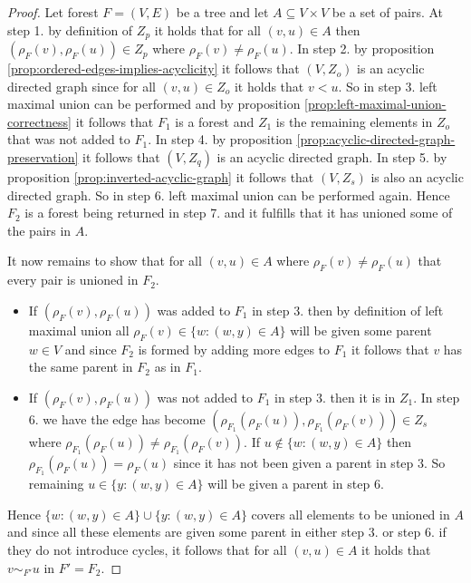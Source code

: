 \documentclass[a4paper,12pt]{article}
\theoremstyle{definition}
\begin{document}
\begin{proof}
    Let forest $F = (V, E)$ be a tree and let $A \subseteq V \times V$ be a set
    of pairs. At step 1. by definition of $Z_p$ it holds that for all $(v, u)
    \in A$ then $(\rho_F(v), \rho_F(u)) \in Z_p$ where $\rho_F(v) \neq
    \rho_F(u)$. In step 2. by proposition
    \ref{prop:ordered-edges-implies-acyclicity} it follows that $(V, Z_o)$ is an
    acyclic directed graph since for all $(v, u) \in Z_o$ it holds that $v < u$.
    So in step 3. left maximal union can be performed and by proposition
    \ref{prop:left-maximal-union-correctness} it follows that $F_1$ is a forest
    and $Z_1$ is the remaining elements in $Z_o$ that was not added to $F_1$. In
    step 4. by proposition \ref{prop:acyclic-directed-graph-preservation} it
    follows that $(V, Z_q)$ is an acyclic directed graph. In step 5. by
    proposition \ref{prop:inverted-acyclic-graph} it follows that $(V, Z_s)$ is
    also an acyclic directed graph. So in step 6. left maximal union can be
    performed again. Hence $F_2$ is a forest being returned in step 7. and it
    fulfills that it has unioned some of the pairs in $A$.

    It now remains to show that for all $(v, u) \in A$ where $\rho_F(v) \neq
    \rho_F(u)$ that every pair is unioned in $F_2$.
    \begin{itemize}
        \item If $(\rho_F(v), \rho_F(u))$ was added to $F_1$ in step 3. then by
         definition of left maximal union all $\rho_F(v) \in \{w : (w, y) \in
         A\}$ will be given some parent $w \in V$ and since $F_2$ is formed by
         adding more edges to $F_1$ it follows that $v$ has the same parent in
         $F_2$ as in $F_1$.
        \item If $(\rho_F(v), \rho_F(u))$ was not added to $F_1$ in step 3. then
        it is in $Z_1$. In step 6. we have the edge has become
        $(\rho_{F_1}(\rho_{F}(u)), \rho_{F_1}(\rho_{F}(v))) \in Z_s$ where
        $\rho_{F_1}(\rho_F(u)) \neq \rho_{F_1}(\rho_{F}(v))$. If $u \notin \{w :
        (w, y) \in A\}$ then $\rho_{F_1}(\rho_{F}(u)) = \rho_{F}(u)$ since it
        has not been given a parent in step 3. So remaining $u \in \{y : (w, y)
        \in A\}$ will be given a parent in step 6.
    \end{itemize}
    Hence $\{w : (w, y) \in A\} \cup \{y : (w, y) \in A\}$ covers all elements
    to be unioned in $A$ and since all these elements are given some parent in
    either step 3. or step 6. if they do not introduce cycles, it follows that
    for all $(v, u) \in A$ it holds that $v \sim_{F'} u$ in $F' = F_2$.
\end{proof}
\end{document}
